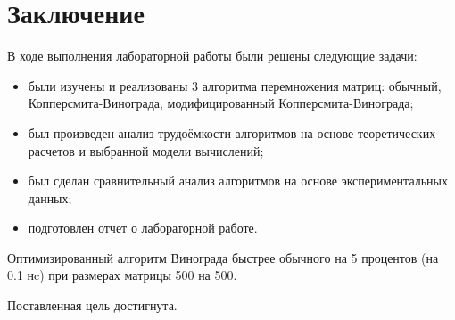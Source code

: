 \chapter*{Заключение}

В ходе выполнения лабораторной работы были решены следующие задачи:

\begin{itemize}
	\item были изучены и реализованы 3 алгоритма перемножения матриц: обычный, Копперсмита-Винограда, модифицированный Копперсмита-Винограда;
	
	\item был произведен анализ трудоёмкости алгоритмов на основе теоретических расчетов и выбранной модели вычислений;
	\item был сделан сравнительный анализ алгоритмов на основе экспериментальных данных;
	
	\item подготовлен отчет о лабораторной работе.
\end{itemize}

Оптимизированный алгоритм Винограда быстрее обычного на 5 процентов (на 0.1 нc)  при размерах матрицы 500 на 500.

Поставленная цель достигнута.